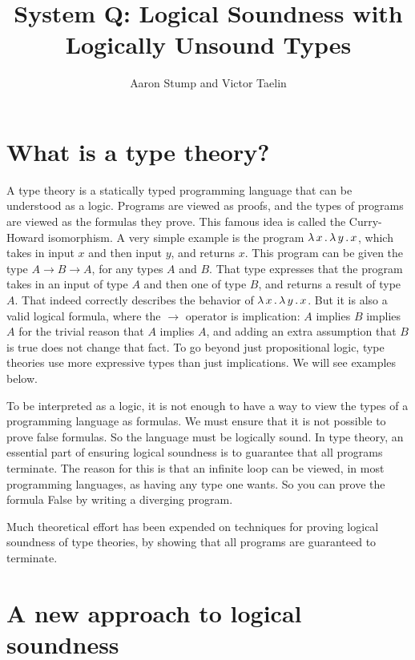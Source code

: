 \documentclass{article}
\begin{document}


\title{System Q: Logical Soundness with Logically Unsound Types}

\author{Aaron Stump and Victor Taelin}

\maketitle

\section{What is a type theory?}

A type theory is a statically typed programming language that can be
understood as a logic.  Programs are viewed as proofs, and the types
of programs are viewed as the formulas they prove.  This famous idea
is called the Curry-Howard isomorphism.  A very simple example is the
program $\lambda\, x\, .\, \lambda\, y\, .\, x$, which takes in input $x$ and then input
$y$, and returns $x$.  This program can be given the type $A \to B \to
A$, for any types $A$ and $B$.  That type expresses that the program
takes in an input of type $A$ and then one of type $B$, and returns a
result of type $A$.  That indeed correctly describes the behavior of
$\lambda\, x\, .\, \lambda\, y\, .\, x$.  But it is also a valid logical formula, where
the $\to$ operator is implication: $A$ implies $B$ implies $A$ for the
trivial reason that $A$ implies $A$, and adding an extra assumption
that $B$ is true does not change that fact.  To go beyond just
propositional logic, type theories use more expressive types than just
implications.  We will see examples below.

To be interpreted as a logic, it is not enough to have a way
to view the types of a programming language as formulas.  We must
ensure that it is not possible to prove false formulas.  So the
language must be logically sound.  In type theory, an essential part
of ensuring logical soundness is to guarantee that all programs
terminate.  The reason for this is that an infinite loop can be
viewed, in most programming languages, as having any type one wants.
So you can prove the formula \textsf{False} by writing a diverging
program.

Much theoretical effort has been expended on techniques for proving
logical soundness of type theories, by showing that all programs
are guaranteed to terminate.  

\section{A new approach to logical soundness}
\end{document}

